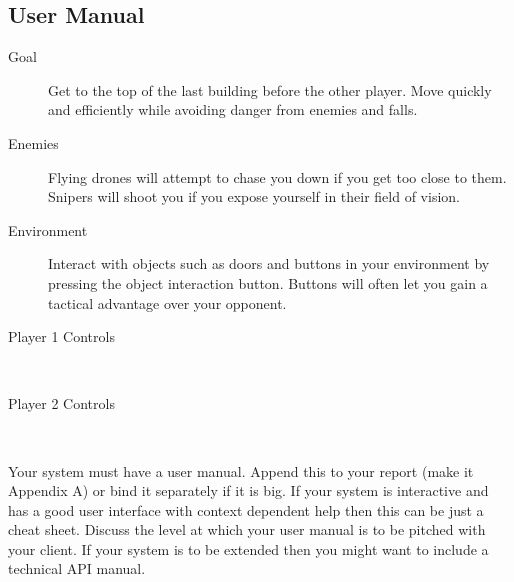 \documentclass[11pt,a4paper]{article}
\newcommand{\itab}[1]{\hspace{0em}\rlap{#1}}
\newcommand{\tab}[1]{\hspace{.2\textwidth}\rlap{#1}}
\begin{document}
\subsection{User Manual}
\label{ss:user-manual}
\begin{description}
	\item [Goal] Get to the top of the last building before the other player. Move quickly and efficiently while avoiding danger from enemies and falls.
	\item [Enemies] Flying drones will attempt to chase you down if you get too close to them. Snipers will shoot you if you expose yourself in their field of vision.
	\item [Environment] Interact with objects such as doors and buttons in your environment by pressing the object interaction button. Buttons will often let you gain a tactical advantage over your opponent.
	\item [Player 1 Controls]\hfill \\
	\item [Player 2 Controls]\hfill \\
\end{description}
Your system must have a user manual. Append this to your report (make
it Appendix A) or bind it separately if it is big. If your system is
interactive and has a good user interface with context dependent help
then this can be just a cheat sheet. Discuss the level at which your
user manual is to be pitched with your client. If your system is to be
extended then you might want to include a technical API manual.
\end{document}
